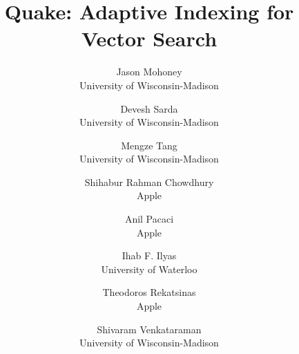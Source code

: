 
\title{\Large \bf Quake: Adaptive Indexing for Vector Search}




\author{
  {\rm Jason Mohoney} \\ University of Wisconsin-Madison
  \and
  {\rm Devesh Sarda} \\ University of Wisconsin-Madison
  \and
  {\rm Mengze Tang} \\ University of Wisconsin-Madison
  \and
  {\rm Shihabur Rahman Chowdhury} \\ Apple
  \and
  {\rm Anil Pacaci} \\ Apple
  \and
  {\rm Ihab F. Ilyas} \\ University of Waterloo
  \and
  {\rm Theodoros Rekatsinas} \\ Apple
  \and
  {\rm Shivaram Venkataraman} \\ University of Wisconsin-Madison
}



\maketitle

\pagestyle{empty}

\begin{abstract}

\end{abstract}

